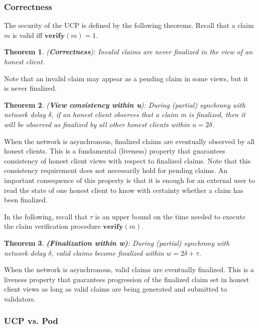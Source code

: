 \documentclass{article}
\newtheorem{theorem}{Theorem}
\newcommand{\UC}{UCP}
\begin{document}
\subsubsection{Correctness}

The security of the \UC{} is defined by the following theorems. Recall that a claim $m$ is valid iff $\textbf{verify}(m) = 1$.

\begin{theorem}{(\textbf{Correctness})}:
    Invalid claims are never finalized in the view of an honest client.
\end{theorem}
Note that an invalid claim may appear as a pending claim in some views, but it is never finalized.

\begin{theorem}{(\textbf{View consistency within u})}:
During (partial) synchrony with network delay $\delta$, if an honest client observes that a claim m is finalized, then it will be observed as finalized by all other honest clients within $u = 2\delta$.
\end{theorem}
When the network is asynchronous, finalized claims are eventually observed by all honest clients. This is a fundamental (liveness) property that guarantees consistency of honest client views with respect to finalized claims. Note that this consistency requirement does not necessarily hold for pending claims. An important consequence of this property is that it is enough for an external user to read the state of one honest client to know with certainty whether a claim has been finalized.

In the following, recall that $\tau$ is an upper bound on the time needed to execute the claim verification procedure $\textbf{verify}(m)$.

\begin{theorem}{\textbf{(Finalization within w)}}:
During (partial) synchrony with network delay $\delta$, valid claims become finalized within $w = 2\delta + \tau$.
\end{theorem}
When the network is asynchronous, valid claims are eventually finalized. This is a liveness property that guarantees progression of the finalized claim set in honest client views as long as valid claims are being generated and submitted to validators.

\subsubsection{\UC{} vs. Pod}
\end{document}

